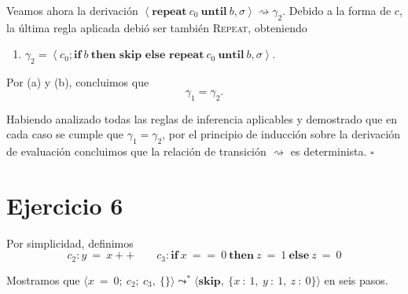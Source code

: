 \documentclass[12pt, a4paper]{article}
\begin{document}
Veamos ahora la derivación
$
\left\langle
\textbf{repeat}\ c_0\ \textbf{until}\ b,\sigma
\right\rangle
\rightsquigarrow
\gamma_2
$.
Debido a la forma de $c$, la última regla aplicada debió ser también \textsc{Repeat}, obteniendo

\begin{enumerate}
    \item[b.] $\gamma_2
    =
    \left\langle
    c_0;\textbf{if}\ b\ \textbf{then skip else repeat}\ c_0\ \textbf{until}\ b,
    \sigma
    \right\rangle$.
\end{enumerate}

Por (a) y (b), concluimos que
\[
\gamma_1=\gamma_2.
\]

\bigskip
\bigskip
Habiendo analizado todas las reglas de inferencia aplicables y demostrado que en cada caso se cumple que $\gamma_1 = \gamma_2$, por el principio de inducción sobre la derivación de evaluación concluimos que la relación de transición $\rightsquigarrow$ es determinista.
\hfill $\square$





\section*{Ejercicio 6}

Por simplicidad, definimos
\[
c_2 : y\ {=}\ x{+}{+}
\qquad
c_3 : \mathbf{if}\ x\ {==}\ 0\ \mathbf{then}\ z\ {=}\ 1\ \mathbf{else}\ z\ {=}\ 0
\]

Mostramos que $\langle x\ {=}\ 0;\ c_2;\ c_3,\ \{\}\rangle \leadsto^* \langle \mathbf{skip},\ \{x\ {:}\ 1,\ y\ {:}\ 1,\ z\ {:}\ 0\}\rangle$ en seis pasos.
\end{document}
